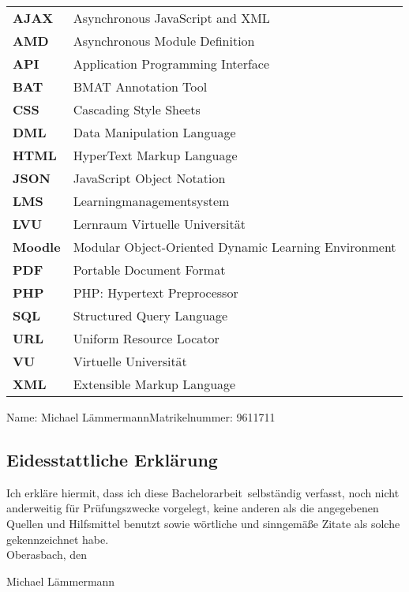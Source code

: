 \documentclass[twoside,bibliography=totoc,openany,numbers=noenddot]{fumi}
\newcommand{\thesisauthor}{Michael Lämmermann}
\newcommand{\thesistype}{Bachelorarbeit} %
\newcommand{\thesismatrikelnummer}{9611711}
\begin{document}
\renewcommand*{\arraystretch}{1.4}
\setlength{\LTleft}{0pt}
\begin{longtable}[l]{p{2cm}p{15cm}}
\textbf{AJAX} & Asynchronous JavaScript and XML \\
\textbf{AMD} & Asynchronous Module Definition \\
\textbf{API} & Application Programming Interface \\
\textbf{BAT} & BMAT Annotation Tool \\
\textbf{CSS} & Cascading Style Sheets \\
\textbf{DML} & Data Manipulation Language \\
\textbf{HTML} & HyperText Markup Language \\
\textbf{JSON} & JavaScript Object Notation \\
\textbf{LMS} & Learningmanagementsystem \\
\textbf{LVU} & Lernraum Virtuelle Universität \\
\textbf{Moodle} & Modular Object-Oriented Dynamic Learning Environment \\
\textbf{PDF} & Portable Document Format \\
\textbf{PHP} & PHP: Hypertext Preprocessor \\
\textbf{SQL} & Structured Query Language \\
\textbf{URL} & Uniform Resource Locator \\
\textbf{VU} & Virtuelle Universität \\
\textbf{XML} & Extensible Markup Language \\
\end{longtable}

\cleardoublepage


Name: \thesisauthor \hfill Matrikelnummer: \thesismatrikelnummer \vspace{2cm}
\subsection*{Eidesstattliche Erklärung}
Ich erkläre hiermit, dass ich diese \thesistype~selbständig verfasst, noch nicht anderweitig für Prüfungszwecke vorgelegt, keine anderen als die angegebenen Quellen und Hilfsmittel benutzt sowie wörtliche und sinngemäße Zitate als solche gekennzeichnet habe.\\[1cm]
Oberasbach, den \dotfill

\hspace{3,5cm}{\footnotesize Datum}\hspace{5cm} {\footnotesize \thesisauthor}
\end{document}
